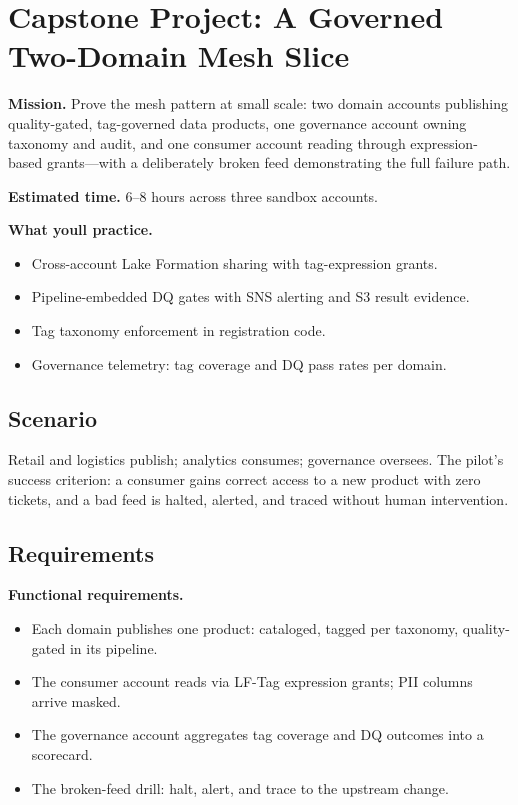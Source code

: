 \section{Capstone Project: A Governed Two-Domain Mesh Slice}\label{sec:ch22-capstone}

\begin{capstonebox}
\textbf{Mission.} Prove the mesh pattern at small scale: two domain accounts publishing quality-gated, tag-governed data products, one governance account owning taxonomy and audit, and one consumer account reading through expression-based grants---with a deliberately broken feed demonstrating the full failure path.

\textbf{Estimated time.} 6--8 hours across three sandbox accounts.

\textbf{What you\textquotesingle{}ll practice.}
\begin{itemize}
    \item Cross-account Lake Formation sharing with tag-expression grants.
    \item Pipeline-embedded DQ gates with SNS alerting and S3 result evidence.
    \item Tag taxonomy enforcement in registration code.
    \item Governance telemetry: tag coverage and DQ pass rates per domain.
\end{itemize}
\end{capstonebox}

\subsection*{Scenario}
Retail and logistics publish; analytics consumes; governance oversees. The pilot's success criterion: a consumer gains correct access to a new product with zero tickets, and a bad feed is halted, alerted, and traced without human intervention.

\subsection*{Requirements}
\textbf{Functional requirements.}
\begin{itemize}
    \item Each domain publishes one product: cataloged, tagged per taxonomy, quality-gated in its pipeline.
    \item The consumer account reads via LF-Tag expression grants; PII columns arrive masked.
    \item The governance account aggregates tag coverage and DQ outcomes into a scorecard.
    \item The broken-feed drill: halt, alert, and trace to the upstream change.
\end{itemize}

